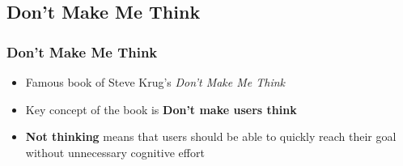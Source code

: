 \documentclass{beamer}
\begin{document}

\subsection{Don't Make Me Think}

\begin{frame}
	\frametitle{Don't Make Me Think}
	\begin{itemize}
		\item Famous book of Steve Krug's \textit{Don't Make Me Think}
		\item Key concept of the book is \textbf{Don't make users think}
		\item \textbf{Not thinking} means that users should be able to quickly reach their goal without unnecessary cognitive effort
	\end{itemize}
\end{frame}
\end{document}
